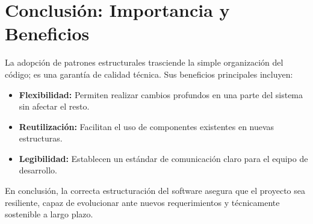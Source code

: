 \documentclass[12pt,longbibliography]{article}
\theoremstyle{definition}
\theoremstyle{remark}
\theoremstyle{example}
\begin{document}
	\section{Conclusión: Importancia y Beneficios}
		La adopción de patrones estructurales trasciende la simple organización del código; es una garantía de calidad técnica. Sus beneficios principales incluyen:
		\begin{itemize}
			\item \textbf{Flexibilidad:} Permiten realizar cambios profundos en una 	parte del sistema sin afectar el resto.
			\item \textbf{Reutilización:} Facilitan el uso de componentes existentes en 	nuevas estructuras.
			\item \textbf{Legibilidad:} Establecen un estándar de comunicación claro para el equipo de desarrollo.
		\end{itemize}
	
		En conclusión, la correcta estructuración del software asegura que el proyecto sea resiliente, capaz de evolucionar ante nuevos requerimientos y técnicamente sostenible a largo plazo.
	
	
	
\end{document}

